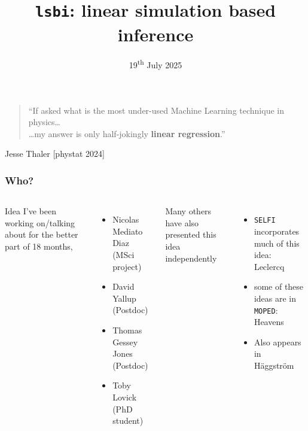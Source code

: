 \documentclass[aspectratio=169]{beamer}
\title{\texttt{lsbi}: linear simulation based inference }
\date{19\textsuperscript{th} July 2025}
\begin{document}
\begin{frame}
    \titlepage
\end{frame}

\begin{frame}
    \begin{quote}
        ``If asked what is the most under-used Machine Learning technique in physics\ldots\\ \hfill\ldots my answer is only half-jokingly \textbf{linear regression}.''\hspace{20pt} 
    \end{quote}

    \hfill Jesse Thaler [phystat 2024]
\end{frame}

\begin{frame}
    \frametitle{Who?}
    \begin{columns}
        Idea I've been working on/talking about for the better part of 18 months,
        \begin{itemize}
            \item Nicolas Mediato Diaz (MSci project)
            \item David Yallup (Postdoc)
            \item Thomas Gessey Jones (Postdoc)
            \item Toby Lovick (PhD student)
        \end{itemize}

        Many others have also presented this idea independently
        \begin{itemize}
            \item \texttt{SELFI} incorporates much of this idea: Leclercq~
            \item some of these ideas are in \texttt{MOPED}: Heavens~
            \item Also appears in Häggström~
        \end{itemize}


\end{columns}
\end{frame}
\end{document}

